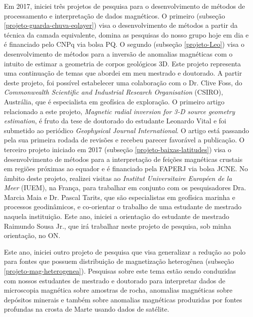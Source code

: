 Em 2017, iniciei três projetos de pesquisa para o desenvolvimento de métodos de 
processamento e interpretação de dados magnéticos. O primeiro 
(subseção \ref{projeto-guarda-chuva-eqlayer}) visa o desenvolvimento de métodos 
a partir da técnica da camada equivalente, domina as pesquisas do nosso grupo hoje em
dia e é financiado pelo CNPq via bolsa PQ. 
O segundo (subseção \ref{projeto-Leo}) visa o desenvolvimento de métodos para a 
inversão de anomalias magnéticas com o intuito de estimar a geometria de corpos 
geológicos 3D. Este projeto representa uma continuação de temas que abordei em meu 
mestrado e doutorado. A partir deste projeto, foi possível estabelecer uma colaboração 
com o Dr. Clive Foss, do \textit{Commonwealth Scientific and Industrial Research 
Organisation} (CSIRO), Austrália, que é especialista em geofísica de exploração. 
O primeiro artigo relacionado a este projeto, \textit{Magnetic radial inversion for 3-D 
source geometry estimation}, é fruto da tese de doutorado do estudante Leonardo Vital 
e foi submetido ao periódico \textit{Geophysical Journal International}. O artigo está 
passando pela sua primeira rodada de revisões e recebeu parecer favorável a publicação.
O terceiro projeto iniciado em 2017 (subseção \ref{projeto-baixas-latitudes}) 
visa o desenvolvimento de métodos para a interpretação de feições magnéticas crustais 
em regiões próximas ao equador e é financiado pela FAPERJ via bolsa JCNE. 
No âmbito deste projeto, realizei visitas ao \textit{Institut Universitaire Européen 
de la Meer} (IUEM), na França, para trabalhar em conjunto com os pesquisadores Dra. 
Marcia Maia e Dr. Pascal Tarits, que são especialistas em geofísica marinha e processos
geodinâmicos, e co-orientar o trabalho de uma estudante de mestrado naquela instituição. 
Este ano, iniciei a orientação do estudante de mestrado Raimundo Sousa Jr., que irá 
trabalhar neste projeto de pesquisa, sob minha orientação, no ON.

Este ano, iniciei outro projeto de pesquisa que visa generalizar a redução ao polo
para fontes que possuem distribuição de magnetização heterogênea (subseção 
\ref{projeto-mag-heterogenea}). Pesquisas sobre este tema estão sendo conduzidas 
com nossos estudantes de mestrado e doutorado para interpretar dados de microscopia 
magnética sobre amostras de rocha, anomalias magnéticas sobre depósitos minerais e 
também sobre anomalias magnéticas produzidas por fontes profundas na crosta de Marte
usando dados de satélite.


